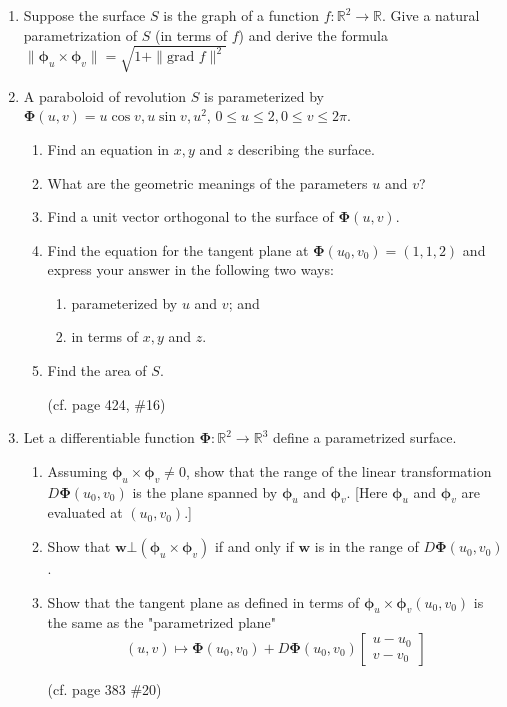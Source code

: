 \documentclass{article}
\newcommand{\norm}[1]{\| #1 \|}
\begin{document}
\begin{enumerate}
    \newpage    
    \item Suppose the surface $S$ is the graph of a function $f : \mathbb{R}^2 \rightarrow \mathbb{R}$. Give a natural parametrization of $S$ (in terms of $f$) and derive the formula $\norm{\boldsymbol \phi_u \times \boldsymbol \phi_v} = \sqrt{1 + \norm{\text{grad }f}^2}$
    \newpage
    \item A paraboloid of revolution $S$ is parameterized by $\boldsymbol \Phi (u,v) = u \cos v, u \sin v, u^2$, $0 \leq u \leq 2, 0 \leq v \leq 2\pi$.
    \begin{enumerate}
        \item Find an equation in $x,y$ and $z$ describing the surface.
        \item What are the geometric meanings of the parameters $u$ and $v$?
        \item Find a unit vector orthogonal to the surface of $\boldsymbol \Phi (u,v)$.
        \item Find the equation for the tangent plane at $\boldsymbol \Phi(u_0,v_0) = (1,1,2)$ and express your answer in the following two ways:
        \begin{enumerate}
            \item parameterized by $u$ and $v$; and
            \item in terms of $x,y$ and $z$.
        \end{enumerate}

        \item Find the area of $S$.

        (cf. page 424, \#16)
    \end{enumerate}
    \newpage
    \item Let a differentiable function $\boldsymbol \Phi : \mathbb{R}^2 \rightarrow \mathbb{R}^3$ define a parametrized surface.
    \begin{enumerate}
        \item Assuming $\boldsymbol \phi_u \times \boldsymbol \phi_v \not = 0$, show that the range of the linear transformation $D \boldsymbol \Phi(u_0,v_0)$ is the plane spanned by $\boldsymbol \phi_u$ and $\boldsymbol \phi_v$. [Here $\boldsymbol \phi_u$ and $\boldsymbol \phi_v$ are evaluated at $(u_0,v_0)$.]
        \item Show that $\boldsymbol w \bot (\boldsymbol \phi_u \times \boldsymbol \phi_v)$ if and only if $\boldsymbol w$ is in the range of $D\boldsymbol \Phi(u_0,v_0)$.
        \item Show that the tangent plane as defined in terms of $\boldsymbol \phi_u \times \boldsymbol \phi_v (u_0,v_0)$ is the same as the "parametrized plane"
        \[
        (u,v) \mapsto \boldsymbol \Phi(u_0,v_0) + D\boldsymbol \Phi(u_0,v_0) \begin{bmatrix} u- u_0 \\ v - v_0 \end{bmatrix}
        \]

        (cf. page 383 \#20)
    \end{enumerate}
\end{enumerate}
\end{document}

